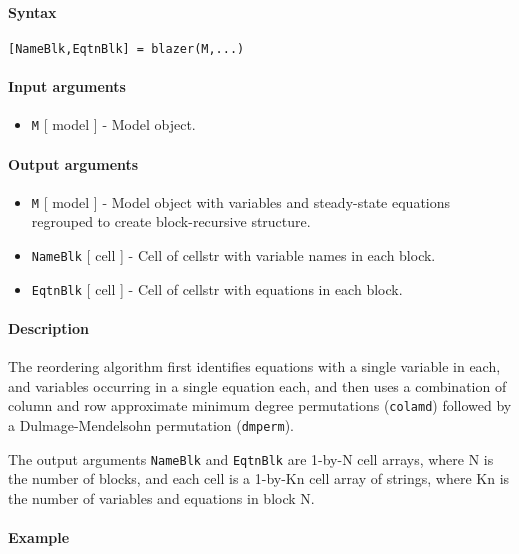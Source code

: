 


	\paragraph{Syntax}

\begin{verbatim}
[NameBlk,EqtnBlk] = blazer(M,...)
\end{verbatim}

\paragraph{Input arguments}

\begin{itemize}
\itemsep1pt\parskip0pt
\item
  \texttt{M} {[} model {]} - Model object.
\end{itemize}

\paragraph{Output arguments}

\begin{itemize}
\item
  \texttt{M} {[} model {]} - Model object with variables and
  steady-state equations regrouped to create block-recursive structure.
\item
  \texttt{NameBlk} {[} cell {]} - Cell of cellstr with variable names in
  each block.
\item
  \texttt{EqtnBlk} {[} cell {]} - Cell of cellstr with equations in each
  block.
\end{itemize}

\paragraph{Description}

The reordering algorithm first identifies equations with a single
variable in each, and variables occurring in a single equation each, and
then uses a combination of column and row approximate minimum degree
permutations (\texttt{colamd}) followed by a Dulmage-Mendelsohn
permutation (\texttt{dmperm}).

The output arguments \texttt{NameBlk} and \texttt{EqtnBlk} are 1-by-N
cell arrays, where N is the number of blocks, and each cell is a 1-by-Kn
cell array of strings, where Kn is the number of variables and equations
in block N.

\paragraph{Example}


